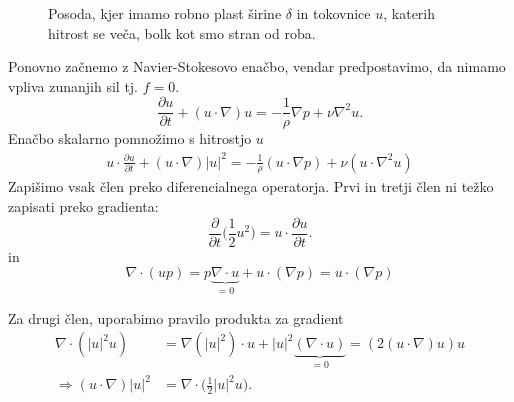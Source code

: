 \documentclass[mat2, tisk]{fmfdelo}
\begin{document}
\begin{figure}[h!]
\caption{Posoda, kjer imamo robno plast širine $\delta$ in tokovnice $u$, katerih hitrost se veča, bolk kot smo stran od roba.}
\end{figure}

Ponovno začnemo z Navier-Stokesovo enačbo, vendar predpostavimo, da nimamo vpliva zunanjih
sil tj. $f = 0$.
$$
\frac{\partial u}{\partial t} + (u\cdot \nabla)u = - \frac{1}{\rho}\nabla p + \nu \nabla^2 u.
$$
Enačbo skalarno pomnožimo s hitrostjo $u$
\begin{align*}
u\cdot\frac{\partial u}{\partial t} + (u\cdot \nabla)|u|^2 = - \frac{1}{\rho}(u\cdot\nabla p) + \nu (u\cdot\nabla^2 u)
\end{align*}
Zapišimo vsak člen preko diferencialnega operatorja. Prvi in tretji člen ni težko 
zapisati preko gradienta:
$$
\frac{\partial}{\partial t} \Big(\frac{1}{2} u^2 \Big) = u\cdot \frac{\partial u}{\partial t}.
$$
in
$$
\nabla \cdot (up) = p\underbrace{\nabla\cdot u}_{=0} + u\cdot (\nabla p) = u\cdot (\nabla p)
$$

Za drugi člen, uporabimo pravilo produkta za gradient 
\begin{align*}
\nabla \cdot (|u|^2 u) &= \nabla(|u|^2) \cdot u + |u|^2 \underbrace{(\nabla \cdot u)}_{= 0} =  (2(u\cdot\nabla)u)u\\[2mm]
\Longrightarrow (u\cdot\nabla)|u|^2 &= \nabla \cdot \Big(\frac{1}{2} |u|^2 u\Big).
\end{align*}
\end{document}
